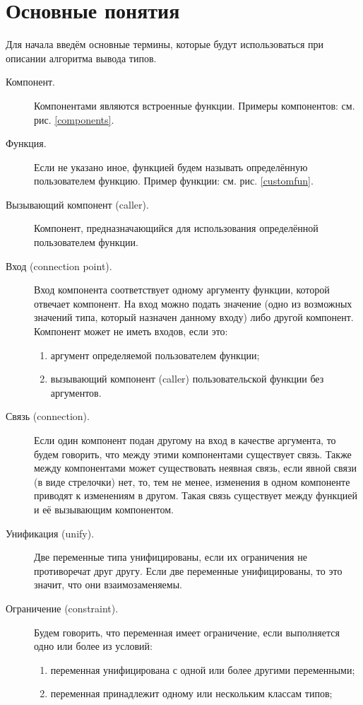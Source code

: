 \section{Основные понятия}
Для начала введём основные термины, которые будут использоваться при описании алгоритма вывода типов.
\begin{description}
	\item[Компонент.] Компонентами являются встроенные функции. Примеры компонентов: см. рис. \ref{components}.
	\item[Функция.] Если не указано иное, функцией будем называть определённую пользователем функцию. Пример функции: см. рис. \ref{customfun}.
	\item[Вызывающий компонент (caller).] Компонент, предназначающийся для использования определённой пользователем функции.
	\item[Вход (connection point).] Вход компонента соответствует одному аргументу функции, которой отвечает компонент. На вход можно подать значение (одно из возможных значений типа, который назначен данному входу) либо другой компонент. Компонент может не иметь входов, если это: 
	\begin{enumerate}[1)]
		\item аргумент определяемой пользователем функции;
		\item вызывающий компонент (caller) пользовательской функции без аргументов.
	\end{enumerate} 
	\item[Связь (connection).] Если один компонент подан другому на вход в качестве аргумента, то будем говорить, что между этими компонентами существует связь. Также между компонентами может существовать неявная связь, если явной связи (в виде стрелочки) нет, то, тем не менее, изменения в одном компоненте приводят к изменениям в другом. Такая связь существует между функцией и её вызывающим компонентом.
	\item[Унификация (unify).] Две переменные типа унифицированы, если их ограничения не противоречат друг другу. Если две переменные унифицированы, то это значит, что они взаимозаменяемы.
	\item[Ограничение (constraint).] Будем говорить, что переменная имеет ограничение, если выполняется одно или более из условий:
		\begin{enumerate}[1)]
			\item переменная унифицирована с одной или более другими переменными;
			\item переменная принадлежит одному или нескольким классам типов;

\end{enumerate}
\end{description}

